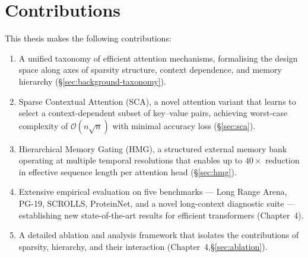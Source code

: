 \section{Contributions}

This thesis makes the following contributions:

\begin{enumerate}[label=\textbf{C\arabic*}, leftmargin=2.5em]
  \item A unified taxonomy of efficient attention mechanisms, formalising the design space
    along axes of sparsity structure, context dependence, and memory hierarchy \hfill
    (\S\ref{sec:background-taxonomy}).

  \item Sparse Contextual Attention (SCA), a novel attention variant that learns to select
    a context-dependent subset of key--value pairs, achieving worst-case complexity of
    $\mathcal{O}(n\sqrt{n})$ with minimal accuracy loss \hfill (\S\ref{sec:sca}).

  \item Hierarchical Memory Gating (HMG), a structured external memory bank operating at
    multiple temporal resolutions that enables up to $40\times$ reduction in effective
    sequence length per attention head \hfill (\S\ref{sec:hmg}).

  \item Extensive empirical evaluation on five benchmarks — Long Range Arena, PG-19,
    SCROLLS, ProteinNet, and a novel long-context diagnostic suite — establishing new
    state-of-the-art results for efficient transformers \hfill (Chapter~4).

  \item A detailed ablation and analysis framework that isolates the contributions of
    sparsity, hierarchy, and their interaction \hfill (Chapter~4,\S\ref{sec:ablation}).
\end{enumerate}
